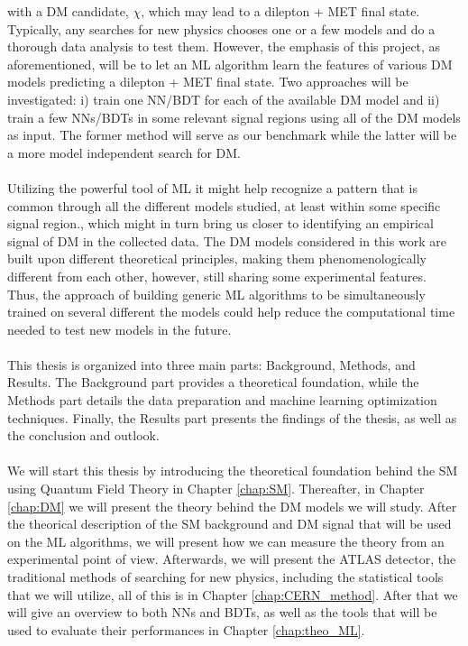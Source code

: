 \documentclass[12pt, a4paper]{book}
\begin{document}
with a DM candidate, $\chi$, which may lead to a dilepton + MET final state. Typically, any searches for new physics chooses one or a few models and do a thorough data analysis to test them. However, the emphasis of this project, as aforementioned, will be to let an ML algorithm 
learn the features of various DM models predicting a dilepton + MET final state.  Two approaches will be investigated: i) train one NN/BDT for each of the available DM model and ii) train a few NNs/BDTs in some relevant signal regions using all of the DM models as input. 
The former method will serve as our benchmark while the latter will be a more model independent search for DM. \\
\\Utilizing the powerful tool of ML it might help recognize a pattern that is common through all the different models studied, at least within some specific signal region., which might in turn bring us closer to identifying an empirical signal of DM in the collected data. 
The DM models considered in this work are built upon different theoretical principles, making them phenomenologically different from each other, however, still sharing some experimental features. Thus, the approach of building generic ML algorithms to be simultaneously trained on several different the models 
could help reduce the computational time needed to test new models in the future.\\
\\This thesis is organized into three main parts: Background, Methods, and Results. The Background part provides a theoretical foundation, while the Methods part details the data preparation and machine learning optimization techniques. 
Finally, the Results part presents the findings of the thesis, as well as the conclusion and outlook.\\
\\We will start this thesis by introducing the theoretical foundation behind the SM using Quantum Field Theory in Chapter \ref{chap:SM}. Thereafter, in Chapter \ref{chap:DM} we will present the theory behind the DM models we will study. After the theorical description of the SM background and DM 
signal that will be used on the ML algorithms, we will present how we can measure the theory from an experimental point of view. Afterwards, we will present the ATLAS detector, the traditional methods of searching for new physics, including the statistical 
tools that we will utilize, all of this is in Chapter \ref{chap:CERN_method}. After that we will give an overview to both NNs and BDTs, as well as the tools that will be used to evaluate their performances in Chapter \ref{chap:theo_ML}.\\
\end{document}
